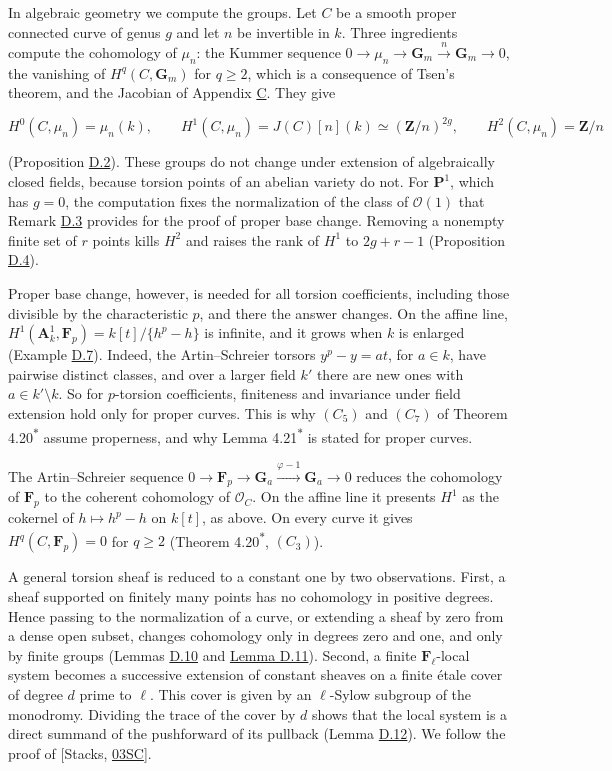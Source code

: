 \documentclass[11pt]{article}
\newcommand{\bpout}[1]{#1\textsuperscript{\hyperlink{bp-outside}{\ensuremath{\ast}}}}
\begin{document}
In algebraic geometry we compute the groups. Let \(C\) be a smooth proper connected curve of genus \(g\) and let \(n\) be invertible in \(k\). Three ingredients compute the cohomology of \(\mu_n\): the Kummer sequence \(0\to\mu_n\to\mathbf G_m\xrightarrow{n}\mathbf G_m\to0\), the vanishing of \(H^q(C,\mathbf G_m)\) for \(q\geq2\), which is a consequence of Tsen's theorem, and the Jacobian of Appendix \hyperref[bp119]{C}. They give

\[
H^0(C,\mu_n)=\mu_n(k),\qquad H^1(C,\mu_n)=J(C)[n](k)\simeq(\mathbf Z/n)^{2g},
\qquad H^2(C,\mu_n)=\mathbf Z/n
\]

(Proposition \hyperref[bp179]{D.2}). These groups do not change under extension of algebraically closed fields, because torsion points of an abelian variety do not. For \(\mathbf P^1\), which has \(g=0\), the computation fixes the normalization of the class of \(\mathcal O(1)\) that Remark \hyperref[bp181]{D.3} provides for the proof of proper base change. Removing a nonempty finite set of \(r\) points kills \(H^2\) and raises the rank of \(H^1\) to \(2g+r-1\) (Proposition \hyperref[bp184]{D.4}).

Proper base change, however, is needed for all torsion coefficients, including those divisible by the characteristic \(p\), and there the answer changes. On the affine line, \(H^1(\mathbf A^1_k,\mathbf F_p)=k[t]/\{h^p-h\}\) is infinite, and it grows when \(k\) is enlarged (Example \hyperref[bp195]{D.7}). Indeed, the Artin–Schreier torsors \(y^p-y=at\), for \(a\in k\), have pairwise distinct classes, and over a larger field \(k'\) there are new ones with \(a\in k'\setminus k\). So for \(p\)-torsion coefficients, finiteness and invariance under field extension hold only for proper curves. This is why \((C_5)\) and \((C_7)\) of Theorem \bpout{4.20} assume properness, and why Lemma \bpout{4.21} is stated for proper curves.

The Artin–Schreier sequence \(0\to\mathbf F_p\to\mathbf G_a\xrightarrow{\varphi-1}\mathbf G_a\to0\) reduces the cohomology of \(\mathbf F_p\) to the coherent cohomology of \(\mathcal O_C\). On the affine line it presents \(H^1\) as the cokernel of \(h\mapsto h^p-h\) on \(k[t]\), as above. On every curve it gives \(H^q(C,\mathbf F_p)=0\) for \(q\geq2\) (Theorem \bpout{4.20}, \((C_3)\)).

A general torsion sheaf is reduced to a constant one by two observations. First, a sheaf supported on finitely many points has no cohomology in positive degrees. Hence passing to the normalization of a curve, or extending a sheaf by zero from a dense open subset, changes cohomology only in degrees zero and one, and only by finite groups (Lemmas \hyperref[bp205]{D.10} and \hyperref[bp210]{Lemma D.11}). Second, a finite \(\mathbf F_\ell\)-local system becomes a successive extension of constant sheaves on a finite étale cover of degree \(d\) prime to \(\ell\). This cover is given by an \(\ell\)-Sylow subgroup of the monodromy. Dividing the trace of the cover by \(d\) shows that the local system is a direct summand of the pushforward of its pullback (Lemma \hyperref[bp215]{D.12}). We follow the proof of [Stacks, \href{https://stacks.math.columbia.edu/tag/03SC}{03SC}].
\end{document}

